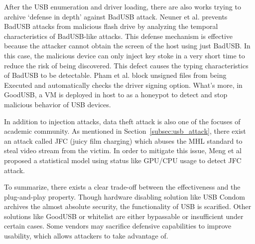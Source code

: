 After the USB enumeration and driver loading, there are also works trying to archive `defense in depth' against BadUSB attack.
Neuner et al.\cite{neuner2018usblock} prevents BadUSB attacks from malicious flash drive by analyzing the temporal characteristics of BadUSB-like attacks. This defense mechanism is effective because the attacker cannot obtain the screen of the host using just BadUSB. In this case, the malicious device can only inject key stoke in a very short time to reduce the risk of being discovered. This defect causes the typing characteristics of BadUSB to be detectable.  Pham et al. \cite{pham2010optimizing} block unsigned files from being Executed and automatically checks the driver signing option. What's more, in GoodUSB, a VM is deployed in host to as a honeypot to detect and stop malicious behavior of USB devices. 

In addition to injection attacks, data theft attack is also one of the focuses of academic community. As mentioned in Section~\ref{subsec:usb_attack}, there exist an attack called JFC (juicy film charging)\cite{JFC} which abuses the MHL standard to steal video stream from the victim. In order to mitigate this issue, Meng et al proposed a statistical model using status like GPU/CPU usage to detect JFC attack\cite{meng2018252}.

To summarize, there exists a clear trade-off between the effectiveness and the plug-and-play property. Though hardware disabling solution like USB Condom archives the almost absolute security, the functionality of USB is scarified. Other solutions like GoodUSB or whitelist are either bypassable or insufficient under certain cases. 
Some vendors may sacrifice defensive capabilities to improve usability, which allows attackers to take advantage of.

